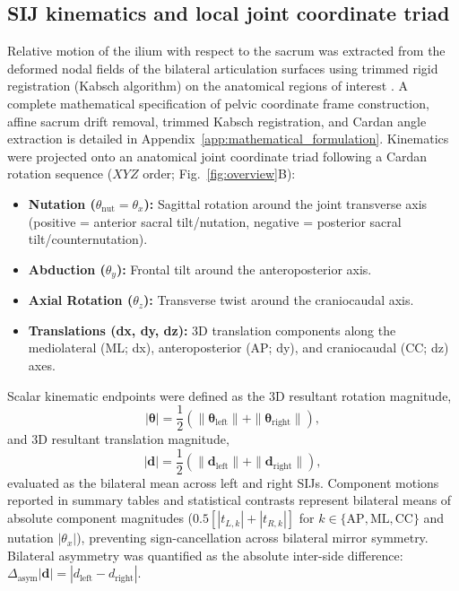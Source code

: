 \subsection{SIJ kinematics and local joint coordinate triad}
Relative motion of the ilium with respect to the sacrum was extracted from the deformed nodal fields of the bilateral articulation surfaces using trimmed rigid registration (Kabsch algorithm) on the anatomical regions of interest \citep{HenyssKuchar2025BoneDat}. A complete mathematical specification of pelvic coordinate frame construction, affine sacrum drift removal, trimmed Kabsch registration, and Cardan angle extraction is detailed in Appendix~\ref{app:mathematical_formulation}. Kinematics were projected onto an anatomical joint coordinate triad following a Cardan rotation sequence ($XYZ$ order; Fig.~\ref{fig:overview}B):
\begin{itemize}
\item \textbf{Nutation ($\theta_{\text{nut}} = \theta_x$):} Sagittal rotation around the joint transverse axis (positive = anterior sacral tilt/nutation, negative = posterior sacral tilt/counternutation).
\item \textbf{Abduction ($\theta_y$):} Frontal tilt around the anteroposterior axis.
\item \textbf{Axial Rotation ($\theta_z$):} Transverse twist around the craniocaudal axis.
\item \textbf{Translations (dx, dy, dz):} 3D translation components along the mediolateral (ML; dx), anteroposterior (AP; dy), and craniocaudal (CC; dz) axes.
\end{itemize}
Scalar kinematic endpoints were defined as the 3D resultant rotation magnitude,
\begin{equation}
|\boldsymbol{\theta}| = \frac{1}{2} \left( \|\boldsymbol{\theta}_{\text{left}}\| + \|\boldsymbol{\theta}_{\text{right}}\| \right),
\end{equation}
and 3D resultant translation magnitude,
\begin{equation}
|\mathbf{d}| = \frac{1}{2} \left( \|\mathbf{d}_{\text{left}}\| + \|\mathbf{d}_{\text{right}}\| \right),
\end{equation}
evaluated as the bilateral mean across left and right SIJs. Component motions reported in summary tables and statistical contrasts represent bilateral means of absolute component magnitudes ($0.5 [|t_{L, k}| + |t_{R, k}|]$ for $k \in \{\text{AP}, \text{ML}, \text{CC}\}$ and nutation $| \theta_{x} |$), preventing sign-cancellation across bilateral mirror symmetry. Bilateral asymmetry was quantified as the absolute inter-side difference: $\Delta_{\text{asym}}|\mathbf{d}| = |d_{\text{left}} - d_{\text{right}}|$.

